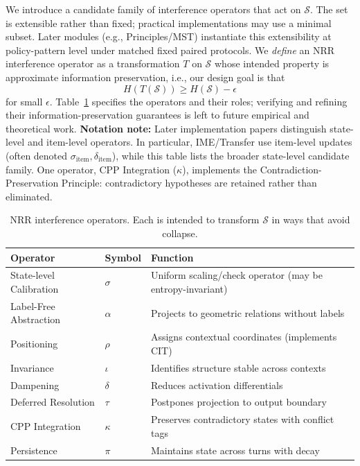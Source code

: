 \documentclass[11pt,a4paper]{article}
\begin{document}
We introduce a candidate family of interference operators that act on $\mathcal{S}$.
The set is extensible rather than fixed; practical implementations may use a minimal subset.
Later modules (e.g., Principles/MST) instantiate this extensibility at policy-pattern level under matched fixed paired protocols.
We \emph{define} an NRR interference operator as a transformation $T$ on $\mathcal{S}$
whose intended property is approximate information preservation, i.e., our design goal is that
\begin{equation}
H(T(\mathcal{S})) \geq H(\mathcal{S}) - \epsilon
\end{equation}
for small $\epsilon$.
Table~\ref{tab:operators} specifies the operators and their roles; verifying and refining their information-preservation guarantees is left to future empirical and theoretical work.
\textbf{Notation note:} Later implementation papers distinguish state-level and item-level operators.
In particular, IME/Transfer use item-level updates (often denoted $\sigma_{\text{item}}, \delta_{\text{item}}$),
while this table lists the broader state-level candidate family.
One operator, CPP Integration ($\kappa$), implements the Contradiction-Preservation Principle: contradictory hypotheses are retained rather than eliminated.

\begin{table}[h]
\centering
\small
\begin{tabular}{lll}
\toprule
\textbf{Operator} & \textbf{Symbol} & \textbf{Function} \\
\midrule
State-level Calibration & $\sigma$ & Uniform scaling/check operator (may be entropy-invariant) \\
Label-Free Abstraction & $\alpha$ & Projects to geometric relations without labels \\
Positioning & $\rho$ & Assigns contextual coordinates (implements CIT) \\
Invariance & $\iota$ & Identifies structure stable across contexts \\
Dampening & $\delta$ & Reduces activation differentials \\
Deferred Resolution & $\tau$ & Postpones projection to output boundary \\
CPP Integration & $\kappa$ & Preserves contradictory states with conflict tags \\
Persistence & $\pi$ & Maintains state across turns with decay \\
\bottomrule
\end{tabular}
\caption{NRR interference operators. Each is intended to transform $\mathcal{S}$ in ways that avoid collapse.}
\label{tab:operators}
\end{table}
\end{document}
